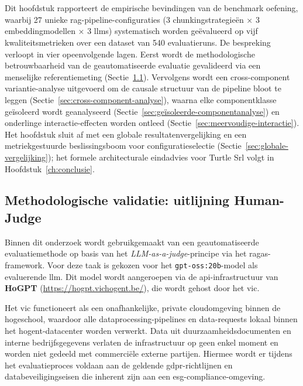 \chapter{}

\label{ch:resultaten}

Dit hoofdstuk rapporteert de empirische bevindingen van de benchmark oefening, waarbij 27 unieke \gls{rag}-pipeline-configuraties (3 chunkingstrategieën × 3 embeddingmodellen × 3 \glspl{llm}) systematisch worden geëvalueerd op vijf kwaliteitsmetrieken over een dataset van 540 evaluatieruns. De bespreking verloopt in vier opeenvolgende lagen. Eerst wordt de methodologische betrouwbaarheid van de geautomatiseerde evaluatie gevalideerd via een menselijke referentiemeting (Sectie~\ref{sec:methodologische-validatie}). Vervolgens wordt een cross-component variantie-analyse uitgevoerd om de causale structuur van de pipeline bloot te leggen (Sectie~\ref{sec:cross-component-analyse}), waarna elke componentklasse geïsoleerd wordt geanalyseerd (Sectie~\ref{sec:geïsoleerde-componentanalyse}) en onderlinge interactie-effecten worden ontleed (Sectie~\ref{sec:meervoudige-interactie}). Het hoofdstuk sluit af met een globale resultatenvergelijking en een metriekgestuurde beslissingsboom voor configuratieselectie (Sectie~\ref{sec:globale-vergelijking}); het formele architecturale eindadvies voor Turtle Srl volgt in Hoofdstuk~\ref{ch:conclusie}.

\section{Methodologische validatie: uitlijning Human-Judge}
\label{sec:methodologische-validatie}

Binnen dit onderzoek wordt gebruikgemaakt van een geautomatiseerde evaluatiemethode op basis van het \textit{LLM-as-a-judge}-principe via het \gls{ragas}-framework. Voor deze taak is gekozen voor het \texttt{gpt-oss:20b}-model als evaluerende \gls{llm}. Dit model wordt aangeroepen via de \gls{api}-infrastructuur van \textbf{HoGPT} (\url{https://hogpt.vichogent.be/}), die wordt gehost door het \gls{vic}.

Het \gls{vic} functioneert als een onafhankelijke, private cloudomgeving binnen de hogeschool, waardoor alle dataprocessing-pipelines en data-requests lokaal binnen het \gls{hogent}-datacenter worden verwerkt. Data uit duurzaamheidsdocumenten en interne bedrijfsgegevens verlaten de infrastructuur op geen enkel moment en worden niet gedeeld met commerciële externe partijen. Hiermee wordt er tijdens het evaluatieproces voldaan aan de geldende \gls{gdpr}-richtlijnen en databeveiligingseisen die inherent zijn aan een \gls{esg}-compliance-omgeving.

